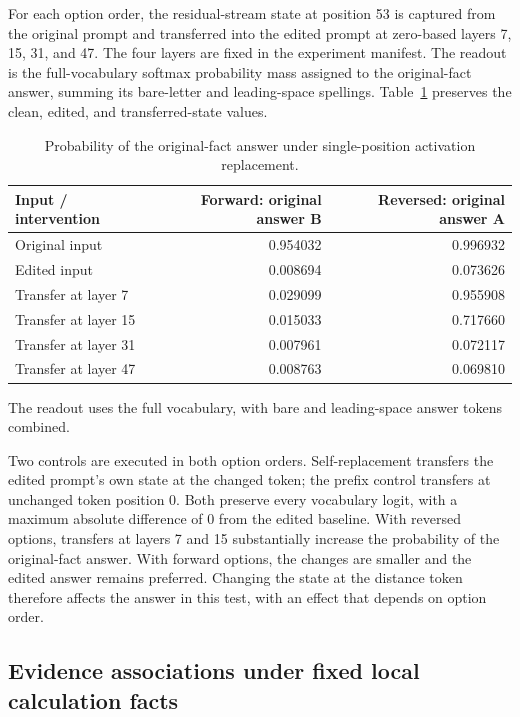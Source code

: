 For each option order, the residual-stream state at position 53 is captured from the original prompt and transferred into the edited prompt at zero-based layers 7, 15, 31, and 47. The four layers are fixed in the experiment manifest. The readout is the full-vocabulary softmax probability mass assigned to the original-fact answer, summing its bare-letter and leading-space spellings. Table~\ref{tab:si-fact-patch} preserves the clean, edited, and transferred-state values.

\begin{table}[!htbp]
\centering\small
\caption{Probability of the original-fact answer under single-position activation replacement.}
\label{tab:si-fact-patch}
\begin{tabular}{lrr}
\toprule
Input / intervention & Forward: original answer B & Reversed: original answer A\\
\midrule
Original input & 0.954032 & 0.996932\\
Edited input & 0.008694 & 0.073626\\
Transfer at layer 7 & 0.029099 & 0.955908\\
Transfer at layer 15 & 0.015033 & 0.717660\\
Transfer at layer 31 & 0.007961 & 0.072117\\
Transfer at layer 47 & 0.008763 & 0.069810\\
\bottomrule
\end{tabular}
\par\smallskip\begin{minipage}{\linewidth}\footnotesize
The readout uses the full vocabulary, with bare and leading-space answer tokens combined.
\end{minipage}
\end{table}

Two controls are executed in both option orders. Self-replacement transfers the edited prompt's own state at the changed token; the prefix control transfers at unchanged token position 0. Both preserve every vocabulary logit, with a maximum absolute difference of 0 from the edited baseline. With reversed options, transfers at layers 7 and 15 substantially increase the probability of the original-fact answer. With forward options, the changes are smaller and the edited answer remains preferred. Changing the state at the distance token therefore affects the answer in this test, with an effect that depends on option order.

\subsection{Evidence associations under fixed local calculation facts}

